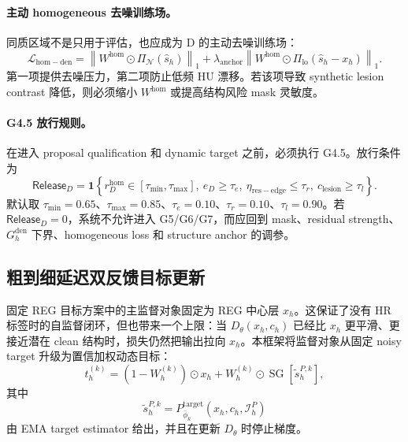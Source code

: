 \documentclass[11pt,a4paper,UTF8,fontset=fandol]{ctexart}
\theoremstyle{definition}
\DeclareMathOperator{\SG}{SG}
\newcommand{\one}{\mathbf{1}}
\begin{document}
\paragraph{主动 homogeneous 去噪训练场。}
同质区域不是只用于评估，也应成为 D 的主动去噪训练场：
\begin{equation}
    \mathcal L_{\mathrm{hom-den}}
    =\left\|W^{\mathrm{hom}}\odot \Pi_{\mathcal N}(\hat s_h)\right\|_1
    +\lambda_{\mathrm{anchor}}
    \left\|W^{\mathrm{hom}}\odot \Pi_{\mathrm{lo}}(\hat s_h-x_h)\right\|_1.
\end{equation}
第一项提供去噪压力，第二项防止低频 HU 漂移。若该项导致 synthetic lesion contrast 降低，则必须缩小 $W^{\mathrm{hom}}$ 或提高结构风险 mask 灵敏度。

\paragraph{G4.5 放行规则。}
在进入 proposal qualification 和 dynamic target 之前，必须执行 G4.5。放行条件为
\begin{equation}
\mathsf{Release}_{D}
=\one\left\{
 r_D^{\mathrm{hom}}\in[\tau_{\min},\tau_{\max}],\
 e_D\ge\tau_e,\
 \eta_{\mathrm{res-edge}}\le\tau_r,\
 c_{\mathrm{lesion}}\ge\tau_l
\right\}.
\end{equation}
默认取 $\tau_{\min}=0.65$、$\tau_{\max}=0.85$、$\tau_e=0.10$、$\tau_r=0.10$、$\tau_l=0.90$。若 $\mathsf{Release}_{D}=0$，系统不允许进入 G5/G6/G7，而应回到 mask、residual strength、$G_h^{\mathrm{den}}$ 下界、homogeneous loss 和 structure anchor 的调参。


\subsection{粗到细延迟双反馈目标更新}
\label{subsec:dual-feedback-target-coreB}

固定 REG 目标方案中的主监督对象固定为 REG 中心层 $x_h$。这保证了没有 HR 标签时的自监督闭环，但也带来一个上限：当 $D_\theta(x_h,c_h)$ 已经比 $x_h$ 更平滑、更接近潜在 clean 结构时，损失仍然把输出拉向 $x_h$。本框架将监督对象从固定 noisy target 升级为置信加权动态目标：
\begin{equation}
\label{eq:dynamic-target-coreB}
    t_h^{(k)}=(1-W_h^{(k)})\odot x_h+W_h^{(k)}\odot \SG[\tilde s_{h}^{P,k}],
\end{equation}
其中
\begin{equation}
\label{eq:pema-target-coreB}
    \tilde s_{h}^{P,k}=P_{\bar\phi_k}^{\mathrm{target}}(x_h,c_h,\mathcal I_h^P)
\end{equation}
由 EMA target estimator 给出，并且在更新 $D_\theta$ 时停止梯度。
\end{document}
